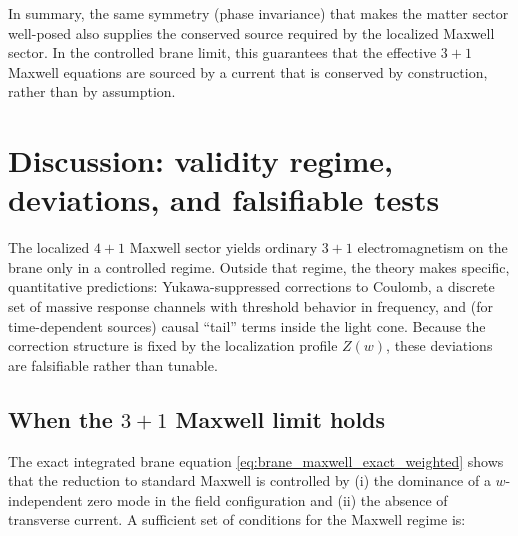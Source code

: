 \documentclass[11pt]{article}
\newcommand{\Z}{Z}
\begin{document}
In summary, the same symmetry (phase invariance) that makes the matter sector
well-posed also supplies the conserved source required by the localized Maxwell
sector. In the controlled brane limit, this guarantees that the effective \(3+1\)
Maxwell equations are sourced by a current that is conserved by construction,
rather than by assumption.

\section{Discussion: validity regime, deviations, and falsifiable tests}
\label{sec:discussion}

The localized \(4+1\) Maxwell sector yields ordinary \(3+1\) electromagnetism on
the brane only in a controlled regime. Outside that regime, the theory makes
specific, quantitative predictions: Yukawa-suppressed corrections to Coulomb, a
discrete set of massive response channels with threshold behavior in frequency,
and (for time-dependent sources) causal ``tail'' terms inside the light cone.
Because the correction structure is fixed by the localization profile \(\Z(w)\),
these deviations are falsifiable rather than tunable.

\subsection{\texorpdfstring{When the \(3+1\) Maxwell limit holds}{When the 3+1 Maxwell limit holds}}
The exact integrated brane equation \cref{eq:brane_maxwell_exact_weighted} shows
that the reduction to standard Maxwell is controlled by (i) the dominance of a
\(w\)-independent zero mode in the field configuration and (ii) the absence of
transverse current. A sufficient set of conditions for the Maxwell regime is:
\end{document}
